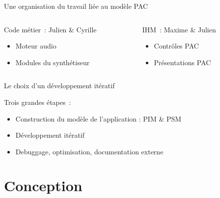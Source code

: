 \documentclass[frenchb]{beamer}
\begin{document}
\begin{frame}{Une organisation du travail liée au modèle PAC}
 \begin{columns}[t]
  \begin{column}{5cm}
  \begin{block}{Code métier~: Julien \& Cyrille}
             \begin{itemize}
                \item Moteur audio
                \item Modules du synthétiseur
            \end{itemize}    
  \end{block} 
  \end{column}
  
  \begin{column}{5cm}
  \begin{block}{IHM~: Maxime \& Julien}
            \begin{itemize}
                \item Contrôles PAC
                \item Présentations PAC
            \end{itemize}
  \end{block}   
  \end{column}
 \end{columns}  
\end{frame}

\begin{frame}{Le choix d'un développement itératif}

\begin{block}{Trois grandes étapes~:}
\begin{itemize}
    \item Construction du modèle de l'application : PIM \& PSM
    \item Développement itératif
    \item Debuggage, optimisation, documentation externe
\end{itemize}
\end{block}
\end{frame}

\section{Conception}
\end{document}
